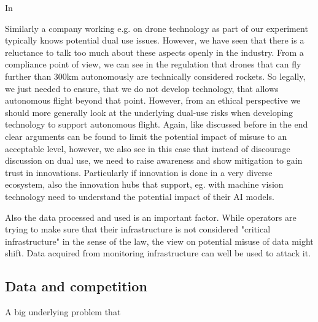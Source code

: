 In 

Similarly a company working e.g. on drone technology as part of our experiment typically knows potential dual use issues. However, we have seen that there is a reluctance to talk too much about these aspects openly in the industry. From a compliance point of view, we can see in the regulation that drones that can fly further than 300km autonomously are technically considered rockets. So legally, we just needed to ensure, that we do not develop technology, that allows autonomous flight beyond that point. However, from an ethical perspective we should more generally look at the underlying dual-use risks when developing technology to support autonomous flight. Again, like discussed before in the end clear arguments can be found to limit the potential impact of misuse to an acceptable level, however, we also see in this case that instead of discourage discussion on dual use, we need to raise awareness and show mitigation to gain trust in innovations. Particularly if innovation is done in a very diverse ecosystem, also the innovation hubs that support, eg. with machine vision technology need to understand the potential impact of their AI models. 

Also the data processed and used is an important factor. While operators are trying to make sure that their infrastructure is not considered "critical infrastructure" in the sense of the law, the view on potential misuse of data might shift. Data acquired from monitoring infrastructure can well be used to attack it. 

\subsection{Data and competition}
A big underlying problem that 
